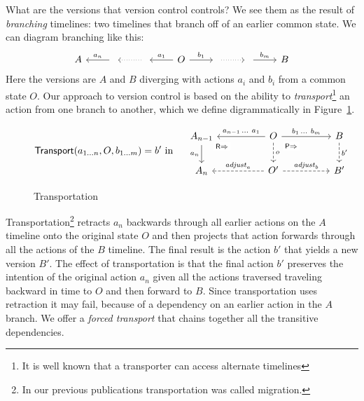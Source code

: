 \documentclass[english,submission]{programming}
\theoremstyle{definition}
\begin{document}
What are the versions that version control controls? We see them as the result of \textit{branching} timelines: two timelines that branch off of an earlier common state. We can diagram branching like this:
\[\begin{tikzcd}
	A & {} & {} & O & {} & {} & B
	\arrow["{{a_n}}"', from=1-2, to=1-1]
	\arrow[dotted, from=1-3, to=1-2]
	\arrow["{{a_1}}"', from=1-4, to=1-3]
	\arrow["{b_1}", from=1-4, to=1-5]
	\arrow[dotted, from=1-5, to=1-6]
	\arrow["{b_m}", from=1-6, to=1-7]
\end{tikzcd}\]
Here the versions are $A$ and $B$ diverging with actions $a_i$ and $b_i$ from a common state $O$. Our approach to version control is based on the ability to \textit{transport}\footnote{It is well known that a transporter can access alternate timelines\cite{mirrormirror}} an action from one branch to another, which we define digrammatically in Figure~\ref{fig:transportation}.
\vspace{-16pt}
\begin{figure}[h]
\[
\textsf{Transport}(a_{1\ldots n}, O, b_{1\ldots m}) = b' \textrm{ in }\quad
\begin{tikzcd}[column sep = huge]
	A_{n-1} & O & B \\
	A_n & {O'} & {B'}
	\arrow["{a_n}"', from=1-1, to=2-1]
	\arrow["{\textsf{R}\Rightarrow}"{description, pos=0.1}, draw=none, from=1-1, to=2-2]
	\arrow["{a_{n-1}\,\ldots\  a_1}"', from=1-2, to=1-1]
	\arrow["{b_1\,\ldots \  b_m}", from=1-2, to=1-3]
	\arrow["o", dashed, from=1-2, to=2-2]
	\arrow["{\textsf{P}\Rightarrow}"{description, pos=0.2}, draw=none, from=1-2, to=2-3]
	\arrow["{b'}", dashed, from=1-3, to=2-3]
	\arrow["{\mathit{adjust}_a}"', dashed, from=2-2, to=2-1]
	\arrow["{\mathit{adjust}_b}", dashed, from=2-2, to=2-3]
\end{tikzcd}\]
\vspace{-16pt}
\caption{Transportation}
\label{fig:transportation}
\end{figure}

Transportation\footnote{In our previous publications transportation was called migration.} retracts $a_n$ backwards through all earlier actions on the $A$ timeline onto the original state $O$ and then projects that action forwards through all the actions of the $B$ timeline. The final result is the action $b'$ that yields a new version $B'$. The effect of transportation is that the final action $b'$ preserves the intention of the original action $a_n$ given all the actions traversed traveling backward in time to $O$ and then forward to $B$.
Since transportation uses retraction it may fail, because of a dependency on an earlier action in the $A$ branch. We offer a \textit{forced transport} that chains together all the transitive dependencies.
\end{document}

